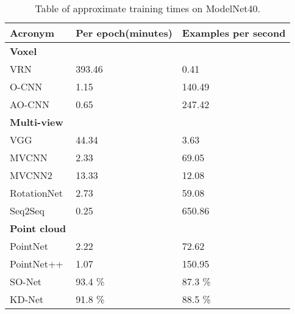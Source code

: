 \begin{table}[]
	\begin{tabular}{lll}
		\hline
		\textbf{Acronym}       & Per epoch(minutes) & Examples per second \\ \hline
		\textbf{Voxel }        &                    &                     \\
		VRN                    & 393.46             & 0.41                \\
		O-CNN                  & 1.15               & 140.49              \\
		AO-CNN                 & 0.65               & 247.42              \\
		\textbf{Multi-view }   &                    &                     \\
		VGG                    & 44.34              & 3.63                \\
		MVCNN                  & 2.33               & 69.05               \\
		MVCNN2                 & 13.33              & 12.08               \\
		RotationNet            & 2.73               & 59.08               \\
		Seq2Seq                & 0.25               & 650.86              \\
		\textbf{Point cloud  } &                    &                     \\
		PointNet               & 2.22               & 72.62               \\
		PointNet++             & 1.07               & 150.95              \\
		SO-Net                 & 93.4 \%            & 87.3 \%             \\
		KD-Net                 & 91.8 \%            & 88.5 \%             	\end{tabular}
\caption{Table of approximate training times on ModelNet40.}
\label{Table:accs}
\end{table}